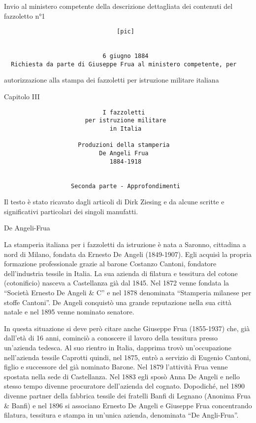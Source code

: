 Invio al ministero competente della descrizione dettagliata dei
contenuti del fazzoletto n°1

\begin{verbatim}
                                [pic]


                            6 giugno 1884
  Richiesta da parte di Giuseppe Frua al ministero competente, per
\end{verbatim}

autorizzazione alla stampa dei fazzoletti per istruzione militare
italiana

Capitolo III

\begin{verbatim}
                            I fazzoletti
                       per istruzione militare
                              in Italia

                     Produzioni della stamperia
                           De Angeli Frua
                              1884-1918


                   Seconda parte - Approfondimenti
\end{verbatim}

Il testo è stato ricavato dagli articoli di Dirk Ziesing e da alcune
scritte e significativi particolari dei singoli manufatti.

De Angeli-Frua

La stamperia italiana per i fazzoletti da istruzione è nata a Saronno,
cittadina a nord di Milano, fondata da Ernesto De Angeli (1849-1907).
Egli acquisì la propria formazione professionale grazie al barone
Costanzo Cantoni, fondatore dell'industria tessile in Italia. La sua
azienda di filatura e tessitura del cotone (cotonificio) nasceva a
Castellanza già dal 1845. Nel 1872 venne fondata la ``Società Ernesto De
Angeli \& C'' e nel 1878 denominata ``Stamperia milanese per stoffe
Cantoni''. De Angeli conquistò una grande reputazione nella sua città
natale e nel 1895 venne nominato senatore.

In questa situazione si deve però citare anche Giuseppe Frua (1855-1937)
che, già dall'età di 16 anni, cominciò a conoscere il lavoro della
tessitura presso un'azienda tedesca. Al suo rientro in Italia, dapprima
trovò un'occupazione nell'azienda tessile Caprotti quindi, nel 1875,
entrò a servizio di Eugenio Cantoni, figlio e successore del già
nominato Barone. Nel 1879 l'attività Frua venne spostata nella sede di
Castellanza. Nel 1883 egli sposò Anna De Angeli e nello stesso tempo
divenne procuratore dell'azienda del cognato. Dopodiché, nel 1890
divenne partner della fabbrica tessile dei fratelli Banfi di Legnano
(Anonima Frua \& Banfi) e nel 1896 si associano Ernesto De Angeli e
Giuseppe Frua concentrando filatura, tessitura e stampa in un'unica
azienda, denominata ``De Angli-Frua''.

